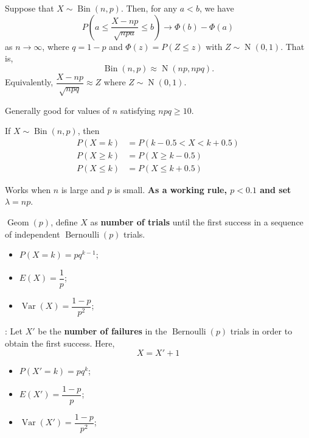  Suppose that \(X \sim
\operatorname{Bin}\left(n,p\right)\). Then, for any \(a < b\), we have
\[P\left(a\leq \dfrac{X-np}{\sqrt{npa}} \leq b\right) \rightarrow \Phi(b) -
\Phi(a)\]
as \(n \rightarrow \infty\), where \(q = 1-p\) and \(\Phi(z) = P(Z \leq z)\) 
with \(Z \sim \operatorname{N}\left(0,1\right)\). That is, 
\[\operatorname{Bin}\left(n,p\right)\approx
\operatorname{N}\left(np,npq\right).\]
Equivalently, \(\dfrac{X-np}{\sqrt{npq}}\approx Z\) where \(Z \sim
\operatorname{N}\left(0,1\right)\).

Generally good for values of \(n\) satisfying \(npq \geq 10\).

 If \(X \sim \operatorname{Bin}\left(n,p\right)\),
then 
\begin{align*}
P(X=k) &= P(k-0.5 < X < k + 0.5) \\
P(X \geq k) &= P(X \geq k- 0.5) \\ 
P(X \leq k) &= P(X \leq k + 0.5)
\end{align*}

 Works when \(n\) is large and \(p\) is
small. \textbf{As a working rule, $p < 0.1$ and set $\lambda = np$}.



 \(\operatorname{Geom}\left(p\right)\), 
define \(X\) as \textbf{number of trials} until the first success in a 
sequence of independent \(\operatorname{Bernoulli}\left(p\right)\) trials.
\begin{itemize}
  \item \(P(X=k) = pq^{k-1}\);
\end{itemize}
\begin{multicols}{2}
\begin{itemize}
  \item \(E(X)=\dfrac{1}{p}\);
  \item \(\operatorname{Var}\left(X\right)=\dfrac{1 - p}{p^2}\);
\end{itemize}
\end{multicols}


: Let \(X'\) be the 
\textbf{number of failures} in the \(\operatorname{Bernoulli}\left(p\right)\)
trials in order to obtain the first success. Here, 
\begin{equation*}
  X = X' + 1
\end{equation*}
\begin{itemize}
  \item \(P(X'=k) = pq^{k}\);
\end{itemize}
\begin{multicols}{2}
\begin{itemize}
  \item \(E(X')=\dfrac{1-p}{p}\);
  \item \(\operatorname{Var}\left(X'\right)=\dfrac{1 - p}{p^2}\);
\end{itemize}
\end{multicols}

